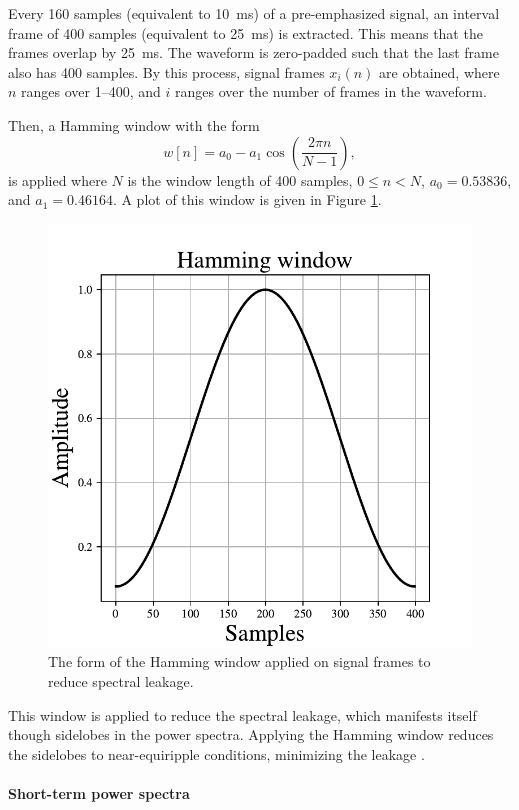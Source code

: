 			Every 160 samples (equivalent to \SI{10}{ms}) of a pre-emphasized signal, an interval frame of 400 samples (equivalent to \SI{25}{ms}) is extracted.
			This means that the frames overlap by \SI{25}{ms}.
			The waveform is zero-padded such that the last frame also has 400 samples.
			By this process, signal frames $x_i(n)$ are obtained, where $n$ ranges over 1--400, and $i$ ranges over the number of frames in the waveform.

			Then, a Hamming window with the form
			\begin{equation}\label{eq:hamming}
				w\left[n\right] = a_0 - a_1\cos\left(\frac{2\pi n}{N-1}\right),
			\end{equation}
			is applied where $N$ is the window length of 400 samples, $0 \leq n < N$, $a_0 = 0.53836$, and $a_1 = 0.46164$.
			A plot of this window is given in Figure \ref{fig:hamming}.
			\begin{figure}[ht]
				\centering
			    \includegraphics[width=0.45\linewidth]{gfx/hamming}
			    \caption{The form of the Hamming window applied on signal frames to reduce spectral leakage.}
			    \label{fig:hamming}
			\end{figure}
			This window is applied to reduce the spectral leakage, which manifests itself though sidelobes in the power spectra.
			Applying the Hamming window reduces the sidelobes to near-equiripple conditions, minimizing the leakage \citep{SASPWEB2011}.

		\paragraph{Short-term power spectra}

